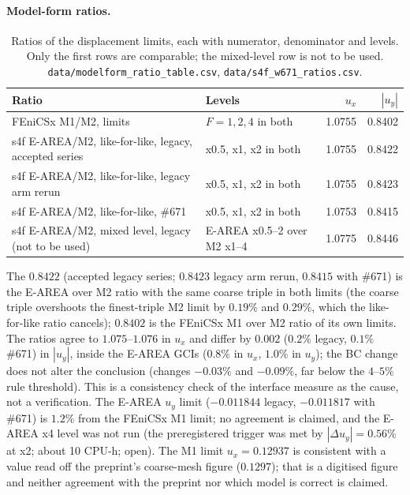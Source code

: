 \documentclass[sn-mathphys,Numbered]{sn-jnl}
\begin{document}
\paragraph{Model-form ratios.}
\begin{table}[htbp]
\centering
\caption{Ratios of the displacement limits, each with numerator, denominator and levels. Only the first rows are comparable; the mixed-level row is not to be used. \texttt{data/modelform\_ratio\_table.csv}, \texttt{data/s4f\_w671\_ratios.csv}.}\label{tab:fx_ratios}
\small
\begin{tabular}{@{}p{6.2cm}p{3.4cm}rr@{}}
\toprule
Ratio & Levels & $u_x$ & $|u_y|$ \\
\midrule
FEniCSx M1/M2, limits & $F=1,2,4$ in both & 1.0755 & 0.8402 \\
s4f E-AREA/M2, like-for-like, legacy, accepted series & x0.5, x1, x2 in both & 1.0755 & 0.8422 \\
s4f E-AREA/M2, like-for-like, legacy arm rerun & x0.5, x1, x2 in both & 1.0755 & 0.8423 \\
s4f E-AREA/M2, like-for-like, \#671 & x0.5, x1, x2 in both & 1.0753 & 0.8415 \\
s4f E-AREA/M2, mixed level, legacy (not to be used) & E-AREA x0.5--2 over M2 x1--4 & 1.0775 & 0.8446 \\
\bottomrule
\end{tabular}
\end{table}
The $0.8422$ (accepted legacy series; $0.8423$ legacy arm rerun, $0.8415$ with \#671) is the E-AREA over M2 ratio with the same coarse triple in both limits (the coarse triple overshoots the finest-triple M2 limit by $0.19\%$ and $0.29\%$, which the like-for-like ratio cancels); $0.8402$ is the FEniCSx M1 over M2 ratio of its own limits.
The ratios agree to $1.075$--$1.076$ in $u_x$ and differ by $0.002$ ($0.2\%$ legacy, $0.1\%$ \#671) in $|u_y|$, inside the E-AREA GCIs ($0.8\%$ in $u_x$, $1.0\%$ in $u_y$); the BC change does not alter the conclusion (changes $-0.03\%$ and $-0.09\%$, far below the $4$--$5\%$ rule threshold).
This is a consistency check of the interface measure as the cause, not a verification.
The E-AREA $u_y$ limit ($-0.011844$ legacy, $-0.011817$ with \#671) is $1.2\%$ from the FEniCSx M1 limit; no agreement is claimed, and the E-AREA x4 level was not run (the preregistered trigger was met by $|\Delta u_y|=0.56\%$ at x2; about 10 CPU-h; open).
The M1 limit $u_x=0.12937$ is consistent with a value read off the preprint's coarse-mesh figure ($0.1297$); that is a digitised figure and neither agreement with the preprint nor which model is correct is claimed.
\end{document}
